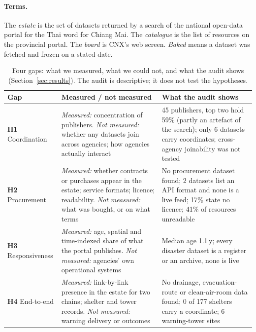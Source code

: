 \documentclass[10pt,twocolumn,a4paper]{article}
\newcommand{\hyp}[1]{\textbf{\color{sigred}#1}}
\begin{document}
\paragraph{Terms.} The \emph{estate} is the set of datasets returned by a search of the national open-data portal for the Thai word for Chiang Mai. The \emph{catalogue} is the list of resources on the provincial portal. The \emph{board} is CNX's web screen. \emph{Baked} means a dataset was fetched and frozen on a stated date.

\begin{table}[!t]
\centering\small
\caption{Four gaps: what we measured, what we could not, and what the audit shows (Section~\ref{sec:results}). The audit is descriptive; it does not test the hypotheses.}\label{tab:hyp}
\begin{tabularx}{\textwidth}{@{}p{2.2cm}XX@{}}
\toprule
\textbf{Gap} & \textbf{Measured / not measured} & \textbf{What the audit shows}\\\midrule
\hyp{H1} Coordination & \emph{Measured:} concentration of publishers. \emph{Not measured:} whether any datasets join across agencies; how agencies actually interact & 45 publishers, top two hold 59\% (partly an artefact of the search); only 6 datasets carry coordinates; cross-agency joinability was not tested\\
\hyp{H2} Procurement & \emph{Measured:} whether contracts or purchases appear in the estate; service formats; licence; readability. \emph{Not measured:} what was bought, or on what terms & No procurement dataset found; 2 datasets list an API format and none is a live feed; 17\% state no licence; 41\% of resources unreadable\\
\hyp{H3} Responsiveness & \emph{Measured:} age, spatial and time-indexed share of what the portal publishes. \emph{Not measured:} agencies' own operational systems & Median age 1.1\,y; every disaster dataset is a register or an archive, none is live\\
\hyp{H4} End-to-end & \emph{Measured:} link-by-link presence in the estate for two chains; shelter and tower records. \emph{Not measured:} warning delivery or outcomes & No drainage, evacuation-route or clean-air-room data found; 0 of 177 shelters carry a coordinate; 6 warning-tower sites\\\bottomrule
\end{tabularx}
\end{table}
\end{document}
